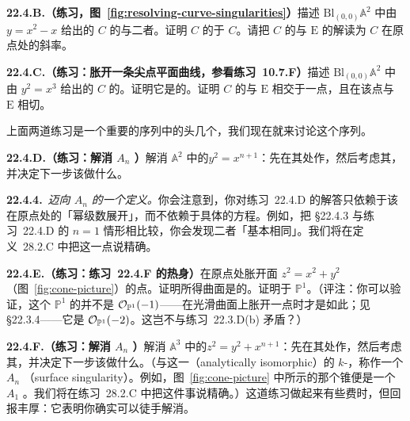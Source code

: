 \textbf{22.4.B.（练习，图~\ref{fig:resolving-curve-singularities}）}\quad 描述 $\mathrm{Bl}_{(0,0)}\mathbb{A}^2$ 中由 $y=x^2-x$ 给出的\trCurve{} $C$ 的\trTotalTransform{}与\trProperTransform{}二者。证明 $C$ 的\trProperTransform{}\trIsomorphic{}于 $C$。请把 $C$ 的\trProperTransform{}与\trExceptionalDivisor{} $\mathrm{E}$ 的\trIntersection{}解读为 $C$ 在原点处的斜率。

\textbf{22.4.C.（练习：胀开一条尖点平面曲线，参看\mbox{练习~10.7.F}）}\quad 描述 $\mathrm{Bl}_{(0,0)}\mathbb{A}^2$ 中由 $y^2=x^3$ 给出的\trCusp{}\trCurve{} $C$ 的\trProperTransform。证明它是\trRegular{}的。证明 $C$ 的\trProperTransform{}与\trExceptionalDivisor{} $\mathrm{E}$ 相交于一点，且在该点与 $\mathrm{E}$ 相切。

上面两道练习是一个重要的\trSingularPoint{}序列中的头几个，我们现在就来讨论这个序列。

\textbf{22.4.D.（练习：解消 $A_n$ \trCurve\trSingularPoint）}\quad 解消 $\mathbb{A}^2$ 中的\trSingularPoint $y^2=x^{n+1}$：先在其\trSingularPoint{}处作\trBlowup，然后考虑其\trProperTransform，并决定下一步该做什么。

\textbf{22.4.4.}\ \emph{迈向 $A_n$ \trCurve\trSingularPoint{}的一个定义。}\quad 你会注意到，你对\mbox{练习~22.4.D} 的解答只依赖于该\trSingularPoint{}在原点处的「幂级数展开」，而不依赖于具体的方程。例如，把 \S22.4.3 与\mbox{练习~22.4.D} 的 $n=1$ 情形相比较，你会发现二者「基本相同」。我们将在\mbox{定义~28.2.C} 中把这一点说精确。

\textbf{22.4.E.（练习：\mbox{练习~22.4.F} 的热身）}\quad 在原点处胀开\trCone{}面 $z^2=x^2+y^2$（图~\ref{fig:cone-picture}）的\trCone{}点。证明所得曲面是\trRegular{}的。证明\trExceptionalDivisor{}\trIsomorphic{}于 $\mathbb{P}^1$。（评注：你可以验证，这个 $\mathbb{P}^1$ 的\trNormalBundle{}并不是 $\mathcal{O}_{\mathbb{P}^1}(-1)$——在光滑曲面上胀开一点时才是如此；见 \S22.3.4——它是 $\mathcal{O}_{\mathbb{P}^1}(-2)$。这岂不与\mbox{练习~22.3.D}(b) 矛盾？）

\textbf{22.4.F.（练习：解消 $A_n$ \trSurface\trSingularPoint）}\quad 解消 $\mathbb{A}^3$ 中的\trSingularPoint $z^2=y^2+x^{n+1}$：先在其\trSingularPoint{}处作\trBlowup，然后考虑其\trProperTransform，并决定下一步该做什么。（与这一\trSingularPoint\trAnalyticallyIsomorphic（analytically isomorphic）的 $k$-\trSurface\trSingularPoint，称作一个 $A_n$ \textbf{\trSurface\trSingularPoint}（surface singularity）。例如，图~\ref{fig:cone-picture} 中所示的那个锥便是一个 $A_1$ \trSurface\trSingularPoint。我们将在\mbox{练习~28.2.C} 中把这件事说精确。）这道练习做起来有些费时，但回报丰厚：它表明你确实可以徒手解消\trSingularPoint。

